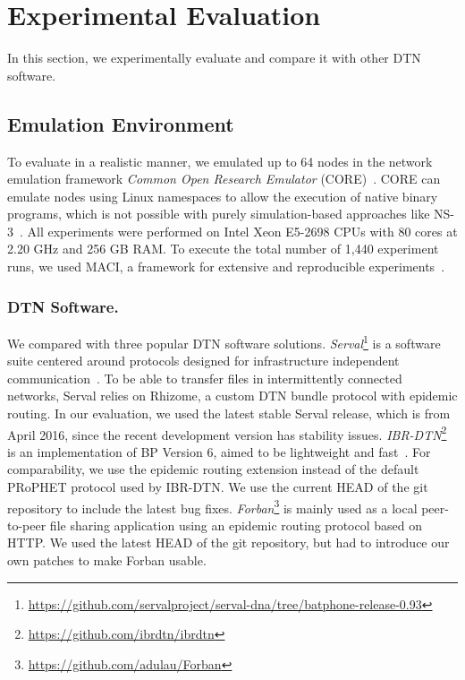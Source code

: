 \section{Experimental Evaluation}
\label{sec:evaluation}

In this section, we experimentally evaluate \dtn and compare it with other DTN software.

\subsection{Emulation Environment}
To evaluate \dtn in a realistic manner, we emulated up to 64 nodes in the network emulation framework \emph{Common Open Research Emulator} (CORE)~\cite{ahrenholz2010comparison}.
CORE can emulate nodes using Linux namespaces to allow the execution of native binary programs, which is not possible with purely simulation-based approaches like NS-3~\cite{riley2010ns,schwerdel2011tomato}.
All experiments were performed on Intel Xeon E5-2698 CPUs with 80 cores at 2.20 GHz and 256 GB RAM.
To execute the total number of 1,440 experiment runs, we used MACI, a framework for extensive and reproducible experiments~\cite{froemmgen2018maci}.

\subsubsection{DTN Software.}
We compared \dtn with three popular DTN software solutions.
\textit{Serval}\footnote{\url{https://github.com/servalproject/serval-dna/tree/batphone-release-0.93}} is a software suite centered around protocols designed for infra\-structure independent communication~\cite{gardner2011serval}.
To be able to transfer files in intermittently connected networks, Serval relies on Rhizome, a custom DTN bundle protocol with epidemic routing.
In our evaluation, we used the latest stable Serval release, which is from April 2016, since the recent development version has stability issues.
\textit{IBR-DTN}\footnote{\url{https://github.com/ibrdtn/ibrdtn}} is an implementation of BP Version 6, aimed to be lightweight and fast~\cite{doering2008ibr}.
For comparability, we use the epidemic routing extension instead of the default PRoPHET protocol used by IBR-DTN.
We use the current HEAD of the git repository to include the latest bug fixes.
\textit{Forban}\footnote{\url{https://github.com/adulau/Forban}} is mainly used as a local peer-to-peer file sharing application using an epidemic routing protocol based on HTTP.
We used the latest HEAD of the git repository, but had to introduce our own patches to make Forban usable.

